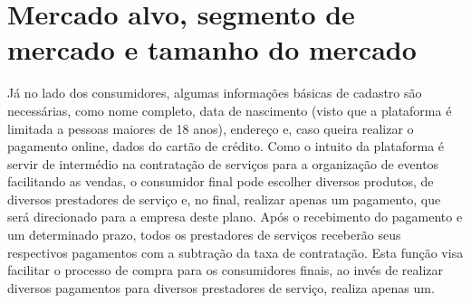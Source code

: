 \section{\textbf{Mercado alvo, segmento de mercado e tamanho do mercado}}
\label{sec: Mercado alvo}


\begin{commentA}

\par \end{commentA}

Já no lado dos consumidores, algumas informações básicas de cadastro são necessárias, como nome completo, data de nascimento (visto que a plataforma é limitada a pessoas maiores de 18 anos), endereço e, caso queira realizar o pagamento online, dados do cartão de crédito. 
Como o intuito da plataforma é servir de intermédio na contratação de serviços para a organização de eventos facilitando as vendas, o consumidor final pode escolher diversos produtos, de diversos prestadores de serviço e, no final, realizar apenas um pagamento, que será direcionado para a empresa deste plano. Após o recebimento do pagamento e um determinado prazo, todos os prestadores de serviços receberão seus respectivos pagamentos com a subtração da taxa de contratação. 
Esta função visa facilitar o processo de compra para os consumidores finais, ao invés de realizar diversos pagamentos para diversos prestadores de serviço, realiza apenas um.
